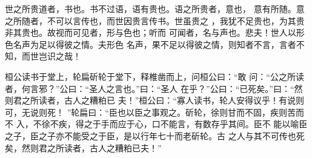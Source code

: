 世之所贵道者，书也。书不过语，语有贵也。语之所贵者，意也， 意有所随。意之所随者，不可以言传也，而世因贵言传书。世虽贵之 ，我犹不足贵也，为其贵非其贵也。故视而可见者，形与色也；听而 可闻者，名与声也。悲夫！世人以形色名声为足以得彼之情。夫形色 名声，果不足以得彼之情，则知者不言，言者不知，而世岂识之哉！

桓公读书于堂上，轮扁斫轮于堂下，释椎凿而上，问桓公曰：“敢 问：“公之所读者，何言邪？”公曰：“圣人之言也。”曰：“圣人 在乎？”公曰：“已死矣。”曰：“然则君之所读者，古人之糟粕已 夫！”桓公曰：“寡人读书，轮人安得议乎！有说则可，无说则死！ ”轮扁曰：“臣也以臣之事观之。斫轮，徐则甘而不固，疾则苦而不 入，不徐不疾，得之于手而应于心，口不能言，有数存乎其间。臣不 能以喻臣之子，臣之子亦不能受之于臣，是以行年七十而老斫轮。古 之人与其不可传也死矣，然则君之所读者，古人之糟粕已夫！”
